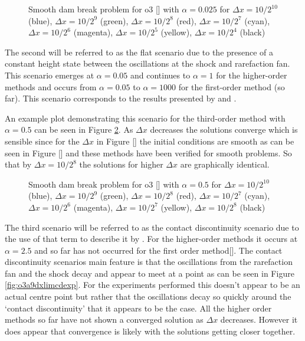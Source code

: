 \documentclass[SingleSpace,12pt,Proceedings]{Serre_ASCE}
\begin{document}
\begin{figure}
\centering
{}
\caption{Smooth dam break problem for o3 [] with $\alpha = 0.025$ for $\Delta x = 10/2^{10}$ (blue), $\Delta x = 10/2^9$ (green), $\Delta x = 10/2^8$ (red), $\Delta x = 10/2^7$ (cyan), $\Delta x = 10/2^6$ (magenta), $\Delta x = 10/2^5$ (yellow), $\Delta x = 10/2^4$ (black)}
\label{fig:o3a1dxlimflatexp}
\end{figure}

The second will be referred to as the flat scenario due to the presence of a constant height state between the oscillations at the shock and rarefaction fan. This scenario emerges at $\alpha = 0.05 $ and continues to $\alpha = 1$ for the higher-order methods and occurs from $\alpha = 0.05 $ to $\alpha = 1000 $ for the first-order method (so far). This scenario corresponds to the results presented by  and . 

An example plot demonstrating this scenario for the third-order method with $\alpha = 0.5$ can be seen in Figure \ref{fig:o3a6dxlimflatexp}. As $\Delta x$ decreases the solutions converge which is sensible since for the $\Delta x$ in Figure [] the initial conditions are smooth as can be seen in Figure [] and these methods have been verified for smooth problems. So that by $\Delta x = 10 / 2^8$ the solutions for higher $\Delta x$ are graphically identical. 

\begin{figure}
\centering
\caption{Smooth dam break problem for o3 [] with $\alpha = 0.5$ for $\Delta x = 10/2^{10}$ (blue), $\Delta x = 10/2^9$ (green), $\Delta x = 10/2^8$ (red), $\Delta x = 10/2^7$ (cyan), $\Delta x = 10/2^6$ (magenta), $\Delta x = 10/2^7$ (yellow), $\Delta x = 10/2^{8}$ (black)}
\label{fig:o3a6dxlimflatexp}
\end{figure}

The third scenario will be referred to as the contact discontinuity scenario due to the use of that term to describe it by . For the higher-order methods it occurs at $\alpha = 2.5$ and so far has not occurred for the first order method[]. The contact discontinuity scenarios main feature is that the oscillations from the rarefaction fan and the shock decay and appear to meet at a point as can be seen in Figure \ref{fig:o3a9dxlimcdexp}. For the experiments performed this doesn't appear to be an actual centre point but rather that the oscillations decay so quickly around the `contact discontinuity' that it appears to be the case. All the higher order methods so far have not shown a converged solution as $\Delta x$ decreases. However it does appear that convergence is likely with the solutions getting closer together. 
\end{document}
